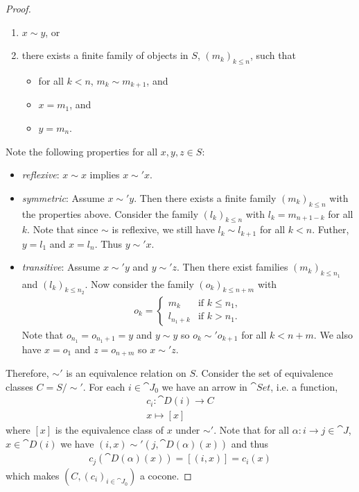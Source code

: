 \documentclass{article}
\begin{document}
\begin{proof}
\begin{enumerate}[label=E\arabic*.]
      \item $x\sim y$, or
      \item there exists a finite family of objects in $S$, $(m_k)_{k\leq n}$, such that \begin{itemize}
               \item for all $k<n$, $m_k\sim m_{k+1}$, and
               \item $x=m_1$, and
               \item $y=m_n$.
            \end{itemize}
   \end{enumerate}
   Note the following properties for all $x,y,z\in S$:
   \begin{itemize}
      \item \emph{reflexive}: $x\sim x$ implies $x\sim'x$.
      \item \emph{symmetric}: Assume $x\sim'y$. Then there exists a finite family $(m_k)_{k\leq n}$ with the properties above.
            Consider the family $(l_k)_{k\leq n}$ with $l_k = m_{n+1-k}$ for all $k$. Note that since $\sim$ is reflexive,
            we still have $l_k\sim l_{k+1}$ for all $k<n$. Futher, $y=l_1$ and $x=l_n$. Thus $y\sim'x$.
      \item \emph{transitive}: Assume $x\sim'y$ and $y\sim'z$. Then there exist families $(m_k)_{k\leq n_1}$ and $(l_k)_{k\leq n_2}$.
            Now consider the family $(o_k)_{k\leq n+m}$ with \begin{align*}
               o_k = \begin{cases}
                  m_k       & \text{if } k\leq n_1, \\
                  l_{n_1+k} & \text{if } k > n_1.
               \end{cases}
            \end{align*}
            Note that $o_{n_1}=o_{n_1+1}=y$ and $y\sim y$ so $o_k \sim' o_{k+1}$ for all $k<n+m$. We also have $x=o_1$ and $z=o_{n+m}$ so $x\sim'z$.
   \end{itemize}
   Therefore, $\sim'$ is an equivalence relation on $S$. Consider the set of equivalence classes $C=S/\sim'$.
   For each $i\in\cat J_0$ we have an arrow in $\cat{Set}$, i.e. a function,
   \begin{align*}
      c_i : \cat D(i) \to C \\
      x \mapsto [x]
   \end{align*}
   where $[x]$ is the equivalence class of $x$ under $\sim'$.
   Note that  for all $\alpha:i\to j\in\cat J$, $x\in \cat D(i)$ we have $(i,x)\sim'(j,\cat D(\alpha)(x))$ and thus
   \begin{align*}
      c_j(\cat D(\alpha)(x)) = [(i,x)] = c_i(x)
   \end{align*}
   which makes $(C, (c_i)_{i\in\cat J_0})$ a cocone.
\end{proof}
\end{document}

